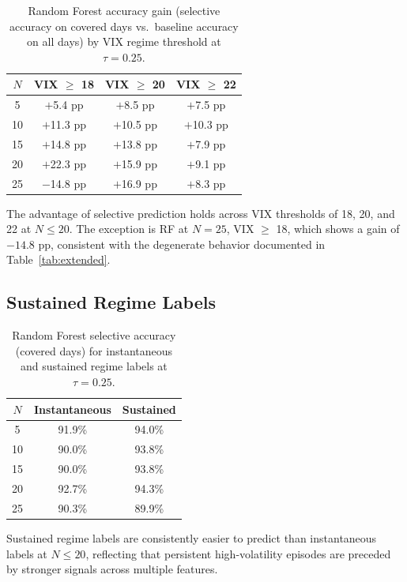 \documentclass[12pt]{article}
\begin{document}
\begin{table}[H]
\centering
\caption{Random Forest accuracy gain (selective accuracy on covered days vs.\ baseline
accuracy on all days) by VIX regime threshold at $\tau = 0.25$.}
\label{tab:robust}
\begin{tabular}{cccc}
\toprule
$N$ & VIX $\geq$ 18 & VIX $\geq$ 20 & VIX $\geq$ 22 \\
\midrule
5  & $+$5.4 pp  & $+$8.5 pp  & $+$7.5 pp  \\
10 & $+$11.3 pp & $+$10.5 pp & $+$10.3 pp \\
15 & $+$14.8 pp & $+$13.8 pp & $+$7.9 pp  \\
20 & $+$22.3 pp & $+$15.9 pp & $+$9.1 pp  \\
25 & $-$14.8 pp & $+$16.9 pp & $+$8.3 pp  \\
\bottomrule
\end{tabular}
\end{table}

The advantage of selective prediction holds across VIX thresholds of 18, 20, and 22 at
$N \leq 20$. The exception is RF at $N = 25$, VIX $\geq$ 18, which shows a gain of $-14.8$ pp,
consistent with the degenerate behavior documented in Table~\ref{tab:extended}.

\subsection{Sustained Regime Labels}
\label{sec:sustained}

\begin{table}[H]
\centering
\caption{Random Forest selective accuracy (covered days) for instantaneous and sustained
regime labels at $\tau = 0.25$.}
\label{tab:sustained}
\begin{tabular}{ccc}
\toprule
$N$ & Instantaneous & Sustained \\
\midrule
5  & 91.9\% & 94.0\% \\
10 & 90.0\% & 93.8\% \\
15 & 90.0\% & 93.8\% \\
20 & 92.7\% & 94.3\% \\
25 & 90.3\% & 89.9\% \\
\bottomrule
\end{tabular}
\end{table}

Sustained regime labels are consistently easier to predict than instantaneous labels at
$N \leq 20$, reflecting that persistent high-volatility episodes are preceded by stronger
signals across multiple features.
\end{document}
